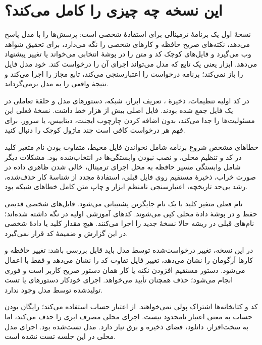 \chapter{این نسخه چه چیزی را کامل می‌کند؟}

نسخهٔ اول یک برنامهٔ ترمینالی برای استفادهٔ شخصی است: پرسش‌ها را با مدل 
 پاسخ می‌دهد، نکته‌های صریح حافظه و کارهای شخصی را نگه می‌دارد، برای تحقیق شواهد وب می‌گیرد و فایل‌های کوچک کد و متن را در پوشهٔ انتخابی می‌خواند یا تغییر پیشنهاد می‌دهد. ابزار یعنی یک تابع 
 که مدل می‌تواند اجرای آن را درخواست کند. خود مدل فایل را باز نمی‌کند؛ برنامه درخواست را اعتبارسنجی می‌کند، تابع مجاز را اجرا می‌کند و نتیجهٔ واقعی را به مدل برمی‌گرداند.

در کد اولیه تنظیمات، ذخیرهٔ 
، تعریف ابزار، شبکه، دستورهای مدل و حلقهٔ تعاملی در یک فایل جمع شده بودند. فایل اصلی بیش از هزار خط داشت. نسخهٔ فعلی این مسئولیت‌ها را جدا می‌کند، بدون اضافه کردن چارچوب ایجنت، دیتابیس، 
 یا سرور. برای فهم هر درخواست کافی است چند ماژول کوچک را دنبال کنید.

خطاهای مشخص شروع برنامه شامل نخواندن فایل محیط، متفاوت بودن نام متغیر کلید در کد و تنظیم محلی، و نصب نبودن وابستگی‌ها در 
 انتخاب‌شده بود. مشکلات دیگر شامل وابستگی مسیر حافظه به محل اجرای ترمینال، خالی شدن ظاهری داده در صورت 
 خراب، ذخیرهٔ مستقیم روی فایل قبلی، استفادهٔ مجدد از شناسهٔ کار حذف‌شده، رشد بی‌حد تاریخچه، اعتبارسنجی نامنظم ابزار و چاپ متن کامل خطاهای شبکه بود.

نام فعلی متغیر کلید با یک نام جایگزین پشتیبانی می‌شود. فایل‌های شخصی قدیمی حفظ و در پوشهٔ دادهٔ محلی کپی می‌شوند. کدهای آموزشی اولیه در 
 نگه داشته شده‌اند؛ نام‌های قبلی در ریشه حالا نسخهٔ جدید را اجرا می‌کنند. هیچ مقدار کلید یا دادهٔ شخصی در این گزارش و ضمیمهٔ کد قرار نمی‌گیرد.

در این نسخه، تغییر درخواست‌شده توسط مدل باید قابل بررسی باشد: تغییر حافظه و کارها آرگومان را نشان می‌دهد، تغییر فایل تفاوت کد را نشان می‌دهد و فقط با 
 اعمال می‌شود. دستور مستقیم افزودن نکته یا کار همان دستور صریح کاربر است و فوری انجام می‌شود؛ حذف همچنان تأیید می‌خواهد. اجرای خودکار دستورهای 
 یا تست تولیدشده توسط مدل وجود ندارد.

کد و کتابخانه‌ها اشتراک پولی نمی‌خواهند. 
 از اعتبار حساب 
 استفاده می‌کند؛ رایگان بودن حساب به معنی اعتبار نامحدود نیست. اجرای محلی مصرف 
 ابری را حذف می‌کند، اما به سخت‌افزار، دانلود، فضای ذخیره و برق نیاز دارد. مدل 
 تست‌شده 
 بود. اجرای مدل محلی در این جلسه تست نشده است.

